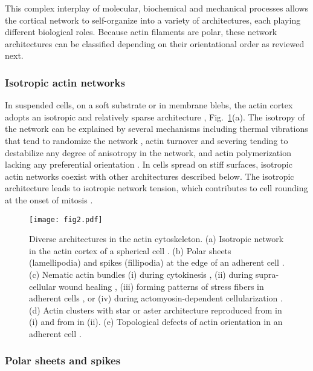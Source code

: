 This complex interplay of molecular, biochemical and mechanical processes allows the cortical network to self-organize into a variety of architectures, each  playing different biological roles. Because actin filaments are polar, these network architectures can be classified depending on their orientational order as reviewed next.


\subsubsection{Isotropic actin networks}

In  suspended cells, on a soft substrate or in membrane blebs, the actin cortex adopts an isotropic and relatively sparse architecture \cite{morone2006, svitkina2020}, Fig.~\ref{chap_1_fig_1}(a). The isotropy of the network can be explained by several mechanisms including thermal vibrations that tend to randomize the network \cite{salbreux2009,anne2016}, actin turnover and severing tending to destabilize any degree of anisotropy in the network, and actin polymerization lacking any preferential orientation \cite{svitkina2020}. In cells spread on stiff surfaces, isotropic actin networks coexist  with other architectures described below. The isotropic architecture leads to isotropic network tension, which contributes to cell rounding at the onset of mitosis \cite{salbreux2012, kelkar2020}.


\begin{figure}
	\centering
	\texttt{[image: fig2.pdf]}
	\caption{\label{chap_1_fig_1} Diverse architectures in the actin cytoskeleton. (a) Isotropic network in the actin cortex of a spherical cell \cite{kelkar2020}. (b) Polar sheets (lamellipodia) and spikes (fillipodia) at the edge of an adherent cell \cite{Mejillano:2004wx}. (c)  Nematic actin bundles (i) during cytokinesis \cite{anne2016}, (ii) during supra-cellular wound healing \cite{10.1242/jcs.109066}, (iii) forming patterns of stress fibers in adherent cells \cite{hotulainen2006}, or (iv) during actomyosin-dependent cellularization \cite{dudin2019}. (d) Actin clusters with star or aster architecture reproduced from  \cite{xia2019} in (i) and from \cite{fritzsche2017} in (ii).%
	(e) Topological defects of actin orientation in an adherent cell \cite{schakenraad2020}. }
\end{figure}

\subsubsection{Polar sheets and spikes}

